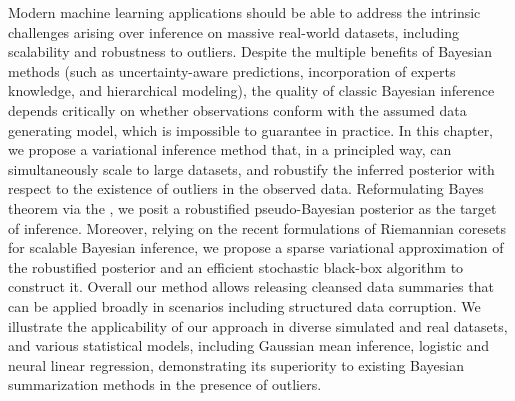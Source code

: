 {
	Modern machine learning applications should be able to address the intrinsic challenges arising over inference on massive real-world datasets, including scalability and robustness to outliers. Despite the multiple benefits of Bayesian methods (such as uncertainty-aware predictions, incorporation of experts knowledge, and hierarchical modeling), the quality of classic Bayesian inference depends critically on whether observations conform with the assumed data generating model, which is impossible to guarantee in practice. In this chapter, we propose a variational inference method that, in a principled way, can simultaneously scale to large datasets, and robustify the inferred posterior with respect to the existence of outliers in the observed data. Reformulating Bayes theorem via the \bdiv, we posit a robustified pseudo-Bayesian posterior as the target of inference. Moreover, relying on the recent formulations of Riemannian coresets for scalable Bayesian inference, we propose a sparse variational approximation of the robustified posterior and an efficient stochastic black-box algorithm to construct it. Overall our method allows releasing cleansed data summaries  that can be applied broadly in scenarios including structured data corruption. We illustrate the applicability of our approach in diverse simulated and real datasets, and various statistical models, including Gaussian mean inference, logistic and neural linear regression, demonstrating its superiority to existing Bayesian summarization methods in the presence of outliers. %
}